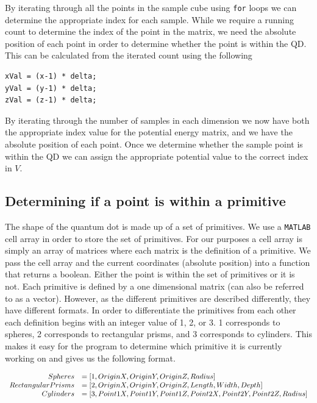 \documentclass[authoryearcitations]{UoYCSproject}
\begin{document}
By iterating through all the points in the sample cube using \verb+for+ loops we can determine the appropriate index
for each sample. While we require a running count to determine the index of the point in the matrix, 
we need the absolute position of each
point in order to determine whether the point is within the QD. This can be calculated from the iterated count
using the following

\begin{lstlisting}[caption={Finding the absolute coordinates}, label=absoluteCoord, firstnumber=16]
xVal = (x-1) * delta;
yVal = (y-1) * delta;
zVal = (z-1) * delta;
\end{lstlisting}

By iterating through the number of samples in each dimension we now have both the appropriate index value for the 
potential energy matrix, and we have the absolute position of each point. Once we determine whether the sample point
is within the QD we can assign the appropriate potential value to the correct index in $V$. 

\subsection{Determining if a point is within a primitive}
The shape of the quantum dot is made up of a set of primitives. We use a \verb+MATLAB+ cell array in order to store
the set of primitives. For our purposes a cell array is simply an array of matrices where each matrix is the
definition of a primitive. We pass the cell array and the current coordinates (absolute position) into a function
that returns a boolean. Either the point is within the set of primitives or it is not. Each primitive is defined
by a one dimensional matrix (can also be referred to as a vector). However, as the different primitives are described
differently, they have different
formats. In order to differentiate the primitives from each other each definition begins with an
integer value of 1, 2, or 3. 1 corresponds to spheres, 2 corresponds to rectangular prisms, and 3 corresponds to 
cylinders. This makes it easy for the program to determine which primitive it is currently working on and gives us the
following format. 

$$\begin{array}{r l}
        Spheres &= [1, OriginX, OriginY, OriginZ, Radius] \\
        Rectangular Prisms &= [2, OriginX, OriginY, OriginZ, Length, Width, Depth] \\
        Cylinders &= [3, Point1X, Point1Y, Point1Z, Point2X, Point2Y, Point2Z, Radius] 
  \end{array}$$
\end{document}
